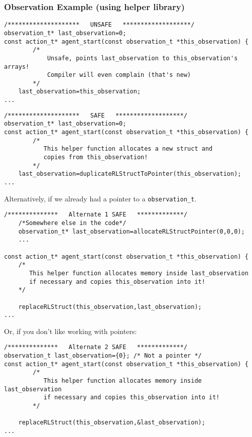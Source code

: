 \documentclass[11pt]{article}
\begin{document}
\subsubsection{Observation Example (using helper library)}


\begin{verbatim}
/********************   UNSAFE   *******************/
observation_t* last_observation=0;
const action_t* agent_start(const observation_t *this_observation) {
        /*
            Unsafe, points last_observation to this_observation's arrays!
            Compiler will even complain (that's new)		
        */
    last_observation=this_observation;
...
\end{verbatim}

\begin{verbatim}
/********************   SAFE   *******************/
observation_t* last_observation=0;
const action_t* agent_start(const observation_t *this_observation) {
        /*
           This helper function allocates a new struct and 
           copies from this_observation!
        */
    last_observation=duplicateRLStructToPointer(this_observation);
...
\end{verbatim}

Alternatively, if we already had a pointer to a \texttt{observation\_t}.
\begin{verbatim}
/**************   Alternate 1 SAFE   *************/
    /*Somewhere else in the code*/
    observation_t* last_observation=allocateRLStructPointer(0,0,0);
    ...

const action_t* agent_start(const observation_t *this_observation) {
    /*
       This helper function allocates memory inside last_observation
       if necessary and copies this_observation into it!
    */

    replaceRLStruct(this_observation,last_observation);
...
\end{verbatim}

Or, if you don't like working with pointers:
\begin{verbatim}
/**************   Alternate 2 SAFE   *************/
observation_t last_observation={0}; /* Not a pointer */
const action_t* agent_start(const observation_t *this_observation) {
        /*
           This helper function allocates memory inside last_observation
           if necessary and copies this_observation into it!
        */
    
    replaceRLStruct(this_observation,&last_observation);
...
\end{verbatim}
\end{document}
